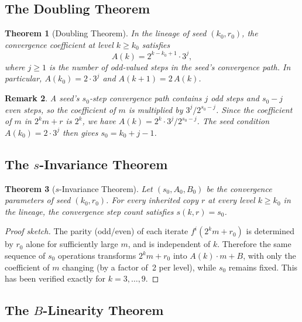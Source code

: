 \documentclass[twocolumn,a4paper,10pt]{article}
\newtheorem{theorem}{Theorem}[section]
\newtheorem{remark}[theorem]{Remark}
\begin{document}
\subsection{The Doubling Theorem}

\begin{theorem}[Doubling Theorem]\label{thm:doubling}
In the lineage of seed $(k_0, r_0)$, the convergence coefficient at level
$k \geq k_0$ satisfies
\[
  A(k) = 2^{k - k_0 + 1} \cdot 3^j,
\]
where $j \geq 1$ is the number of odd-valued steps in the seed's
convergence path.
In particular, $A(k_0) = 2 \cdot 3^j$ and $A(k+1) = 2\, A(k)$.
\end{theorem}

\begin{remark}
A seed's $s_0$-step convergence path contains $j$ odd steps and $s_0 - j$
even steps, so the coefficient of $m$ is multiplied by $3^j / 2^{s_0-j}$.
Since the coefficient of $m$ in $2^k m + r$ is $2^k$, we have
$A(k) = 2^k \cdot 3^j / 2^{s_0-j}$.
The seed condition $A(k_0) = 2\cdot 3^j$ then gives $s_0 = k_0 + j - 1$.
\end{remark}

\subsection{The $s$-Invariance Theorem}

\begin{theorem}[$s$-Invariance Theorem]\label{thm:sinvariant}
Let $(s_0, A_0, B_0)$ be the convergence parameters of seed $(k_0, r_0)$.
For every inherited copy $r$ at every level $k \geq k_0$ in the lineage,
the convergence step count satisfies $s(k, r) = s_0$.
\end{theorem}

\begin{proof}[Proof sketch]
The parity (odd/even) of each iterate $f^i(2^k m + r_0)$ is determined
by $r_0$ alone for sufficiently large $m$, and is independent of $k$.
Therefore the same sequence of $s_0$ operations transforms
$2^k m + r_0$ into $A(k) \cdot m + B$, with only the coefficient of $m$
changing (by a factor of~2 per level), while $s_0$ remains fixed.
This has been verified exactly for $k = 3, \ldots, 9$.
\end{proof}

\subsection{The $B$-Linearity Theorem}
\end{document}
